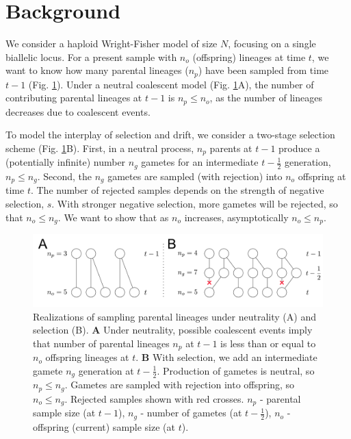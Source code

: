 \documentclass[review]{elsarticle}
\begin{document}

\section{Background}
\label{sec:background}

We consider a haploid Wright-Fisher model of size $N$, focusing on a single biallelic locus. For a
present sample with $n_o$ (offspring) lineages at time $t$, we want to know how many parental
lineages ($n_p$) have been sampled from time $t-1$ (Fig. \ref{fig:schematic}). Under a neutral
coalescent model (Fig. \ref{fig:schematic}A), the number of contributing parental lineages at $t-1$
is $n_p \le n_o$, as the number of lineages decreases due to coalescent events.

To model the interplay of selection and drift, we consider a two-stage selection scheme (Fig.
\ref{fig:schematic}B). First, in a neutral process, $n_p$ parents at $t-1$ produce a (potentially
infinite) number $n_g$ gametes for an intermediate $t-\frac{1}{2}$ generation, $n_p \le n_g$. Second, the $n_g$
gametes are sampled (with rejection) into $n_o$ offspring at time $t$. The number of rejected samples
depends on the strength of negative selection, $s$. With stronger negative selection, more gametes
will be rejected, so that $n_o \le n_g$. We want to show that as $n_o$ increases, asymptotically
$n_o \le n_p$.

\begin{figure}[ht]
  \centering
  \includegraphics[width=1.0\textwidth]{fig/schematic.pdf}
  \caption{\label{fig:schematic} Realizations of sampling parental lineages under neutrality (A) and
    selection (B). \textbf{A} Under neutrality, possible coalescent events imply that number of
    parental lineages $n_p$ at $t-1$ is less than or equal to $n_o$ offspring lineages at $t$.
    \textbf{B} With selection, we add an intermediate gamete $n_g$ generation at $t-\frac{1}{2}$.
    Production of gametes is neutral, so $n_p\le n_g$. Gametes are sampled with rejection into
    offspring, so $n_o \le n_g$. Rejected samples shown with red crosses. $n_p$ - parental sample
    size (at $t-1$), $n_g$ - number of gametes (at $t-\frac{1}{2}$), $n_o$ - offspring (current)
    sample size (at $t$).}
\end{figure}
\end{document}
